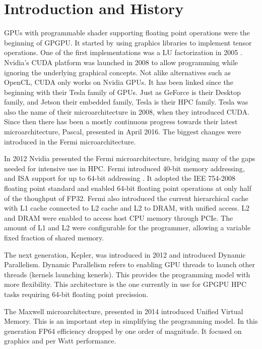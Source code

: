 
\section{Introduction and History}

GPUs with programmable shader supporting floating point operations were the beginning of GPGPU.
It started by using graphics libraries to implement tensor operations.
One of the first implementations was a LU factorization in 2005 \cite{du2012cuda}.
Nvidia's CUDA platform was launched in 2008 to allow programming while ignoring the underlying graphical concepts.
Not alike alternatives such as OpenCL, CUDA only works on Nvidia GPUs.
It has been linked since the beginning with their Tesla family of GPUs.
Just as GeForce is their Desktop family, and Jetson their embedded family, Tesla is their HPC family.
Tesla was also the name of their microarchitecture in 2008, when they introduced CUDA.
Since then there has been a mostly continuous progress towards their latest microarchitecture, Pascal, presented in April 2016.
The biggest changes were introduced in the Fermi microarchitecture.

In 2012 Nvidia presented the Fermi microarchitecture, bridging many of the gaps needed for intensive use in HPC.
Fermi introduced 40-bit memory addressing, and ISA support for up to 64-bit addressing \cite{nickolls2010gpu}.
It adopted the IEE 754-2008 floating point standard and enabled 64-bit floating point operations at only half of the thoughput of FP32.
Fermi also introduced the current hierarchical cache with L1 cache connected to L2 cache and L2 to DRAM, with unified access.
L2 and DRAM were enabled to access host CPU memory through PCIe.
The amount of L1 and L2 were configurable for the programmer, allowing a variable fixed fraction of shared memory.

The next generation, Kepler, was introduced in 2012 and introduced Dynamic Parallelism.
Dynamic Parallelism refers to enabling GPU threads to launch other threads (kernels launching kenerls).
This provides the programming model with more flexibility.
This architecture is the one currently in use for GPGPU HPC tasks requiring 64-bit floating point precission.

The Maxwell microarchitecture, presented in 2014 introduced Unified Virtual Memory.
This is an important step in simplifying the programming model.
In this generation FP64 efficiency dropped by one order of magnitude.
It focused on graphics and per Watt performance.

